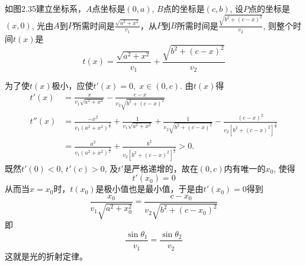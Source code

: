\begin{solution}
如图2.35建立坐标系，$A$点坐标是$(0,a)$, $B$点的坐标是$(c,b)$, 设$P$点的坐标是$(x,0)$, 光由$A$到$P$所需时间是$\frac{\sqrt{a^2+x^2}}{v_1}$，从$P$到$B$所需时间是$\frac{\sqrt{b^2+(c-x)^2}}{v_2}$, 
则整个时间$t(x)$是
\[t (x) =\frac{\sqrt{a^2+x^2}}{v_1}+\frac{\sqrt{b^2+(c-x)^2}}{v_2}\]

为了使$t(x)$极小，应使$t'(x)=0,\; x\in (0,c)$. 由$t(x)$得
\[\begin{split}
    t' (x) &=\frac{x}{v_1\sqrt{a^2+x^2}}-\frac{c-x}{v_2\sqrt{b^2+(c-x)^2}}\\
    t'' (x) &=\frac{-x^2}{v_1(a^2+x^2)^{\tfrac{3}{2}}}+\frac{1}{v_1\sqrt{a^2+x^2}}+\frac{1}{v_2\sqrt{b^2+(c-x)^2}}-\frac{(c-x)^2}{v_2\left[b^2+(c-x)^2\right]^{\tfrac{3}{2}}}\\
    &=\frac{a^2}{v_1(a^2+x^2)^{\tfrac{3}{2}}}+\frac{b^2}{v_2\left[b^2+(c-x)^2\right]^{\tfrac{3}{2}}}>0.
\end{split}\]
既然$t'(0)<0$, $t'(c)>0$, 及$t'$是严格递增的，故在$(0,c)$内有唯一的$x_0$, 使得
\[t'(x_0)=0\]
从而当$x=x_0$时，$t(x_0)$是极小值也是最小值，于是由$t'(x_0)=0$得到
\[\frac{x_0}{v_1\sqrt{a^2+x^2_0}}=\frac{c-x_0}{v_2\sqrt{b^2+(c-x_0)^2}}\]
即
\[\frac{\sin\theta_1}{v_1}=\frac{\sin\theta_2}{v_2}\]
这就是光的折射定律。
\end{solution}

